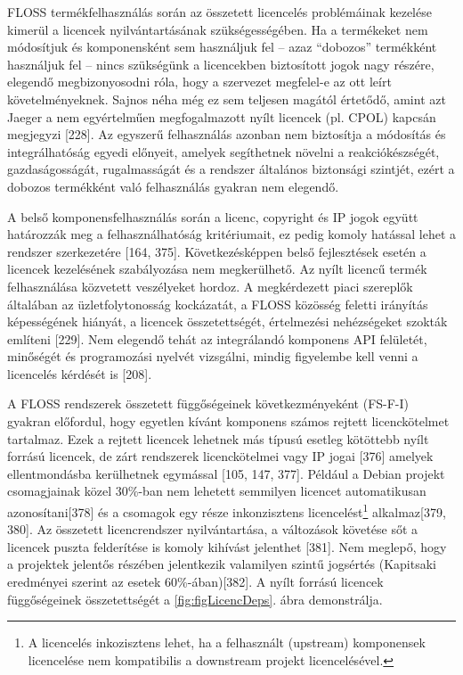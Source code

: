 \documentclass[12pt,magyar,a4paper,oneside]{scrreprt}
\begin{document}
FLOSS termékfelhasználás során az összetett licencelés problémáinak
kezelése kimerül a licencek nyilvántartásának szükségességében. Ha a
termékeket nem módosítjuk és komponensként sem használjuk fel -- azaz
``dobozos'' termékként használjuk fel -- nincs szükségünk a licencekben
biztosított jogok nagy részére, elegendő megbizonyosodni róla, hogy a
szervezet megfelel-e az ott leírt követelményeknek. Sajnos néha még ez
sem teljesen magától értetődő, amint azt Jaeger a nem egyértelműen
megfogalmazott nyílt licencek (pl. CPOL) kapcsán megjegyzi {[}228{]}. Az
egyszerű felhasználás azonban nem biztosítja a módosítás és
integrálhatóság egyedi előnyeit, amelyek segíthetnek növelni a
reakciókészségét, gazdaságosságát, rugalmasságát és a rendszer általános
biztonsági szintjét, ezért a dobozos termékként való felhasználás
gyakran nem elegendő.

A belső komponensfelhasználás során a licenc, copyright és IP jogok
együtt határozzák meg a felhasználhatóság kritériumait, ez pedig komoly
hatással lehet a rendszer szerkezetére {[}164, 375{]}. Következésképpen
belső fejlesztések esetén a licencek kezelésének szabályozása nem
megkerülhető. Az nyílt licencű termék felhasználása közvetett
veszélyeket hordoz. A megkérdezett piaci szereplők általában az
üzletfolytonosság kockázatát, a FLOSS közösség feletti irányítás
képességének hiányát, a licencek összetettségét, értelmezési
nehézségeket szokták említeni {[}229{]}. Nem elegendő tehát az
integrálandó komponens API felületét, minőségét és programozási nyelvét
vizsgálni, mindig figyelembe kell venni a licencelés kérdését is
{[}208{]}.

A FLOSS rendszerek összetett függőségeinek következményeként (FS-F-I)
gyakran előfordul, hogy egyetlen kívánt komponens számos rejtett
licenckötelmet tartalmaz. Ezek a rejtett licencek lehetnek más típusú
esetleg kötöttebb nyílt forrású licencek, de zárt rendszerek
licenckötelmei vagy IP jogai {[}376{]} amelyek ellentmondásba
kerülhetnek egymással {[}105, 147, 377{]}. Például a Debian projekt
csomagjainak közel 30\%-ban nem lehetett semmilyen licencet
automatikusan azonosítani{[}378{]} és a csomagok egy része inkonzisztens
licencelést\footnote{A licencelés inkozisztens lehet, ha a felhasznált
  (upstream) komponensek licencelése nem kompatibilis a downstream
  projekt licencelésével.} alkalmaz{[}379, 380{]}. Az összetett
licencrendszer nyilvántartása, a változások követése sőt a licencek
puszta felderítése is komoly kihívást jelenthet {[}381{]}. Nem meglepő,
hogy a projektek jelentős részében jelentkezik valamilyen szintű
jogsértés (Kapitsaki eredményei szerint az esetek 60\%-ában){[}382{]}. A
nyílt forrású licencek függőségeinek összetettségét a
\ref{fig:figLicencDeps}. ábra demonstrálja.
\end{document}
